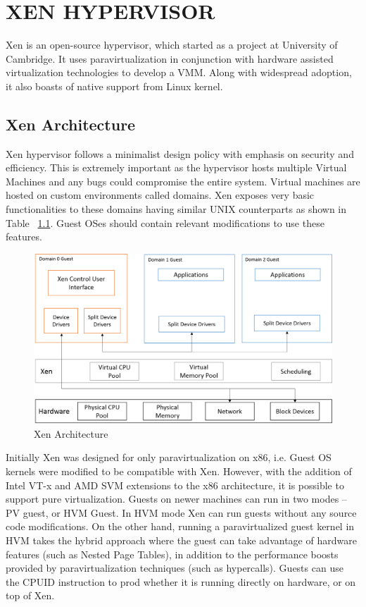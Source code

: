 \chapter{\uppercase{Xen Hypervisor}}

Xen is an open-source hypervisor, which started as a project at University of Cambridge. It uses paravirtualization in conjunction with hardware assisted virtualization technologies to develop a VMM. Along with widespread adoption, it also boasts of native support from Linux kernel.

\section{Xen Architecture}

Xen hypervisor follows a minimalist design policy with emphasis on security and efficiency. This is extremely important as the hypervisor hosts multiple Virtual Machines and any bugs could compromise the entire system. Virtual machines are hosted on custom environments called domains. Xen exposes very basic functionalities to these domains having similar UNIX counterparts as shown in Table ~\ref{tab:unixcomp}. Guest OSes should contain relevant modifications to use these features. 


\begin{figure}[H]
\centering
\includegraphics[scale=0.6]{figures/Xen_model.png}
\caption{Xen Architecture}
\label{tab:unixcomp}
\end{figure}
Initially Xen was designed for only paravirtualization on x86, i.e. Guest OS kernels were modified to be compatible with Xen. However, with the addition of Intel VT-x and AMD SVM extensions to the x86 architecture, it is possible to support pure virtualization. Guests on newer machines can run in two modes -- PV guest, or HVM Guest. In HVM mode Xen can run guests without any source code modifications. On the other hand, running a paravirtualized guest kernel in HVM takes the hybrid approach where the guest can take advantage of hardware features (such as Nested Page Tables), in addition to the performance boosts provided by paravirtualization techniques (such as hypercalls). Guests can use the CPUID instruction to prod whether it is running directly on hardware, or on top of Xen.  

